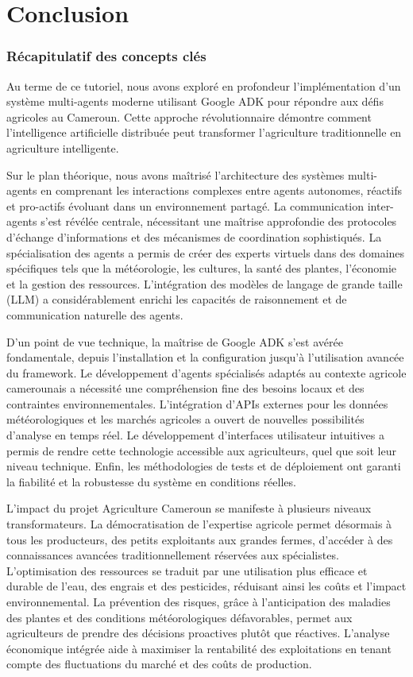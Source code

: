 \chapter*{Conclusion}

\subsection{Récapitulatif des concepts clés}

Au terme de ce tutoriel, nous avons exploré en profondeur l'implémentation d'un système multi-agents moderne utilisant Google ADK pour répondre aux défis agricoles au Cameroun. Cette approche révolutionnaire démontre comment l'intelligence artificielle distribuée peut transformer l'agriculture traditionnelle en agriculture intelligente.

Sur le plan théorique, nous avons maîtrisé l'architecture des systèmes multi-agents en comprenant les interactions complexes entre agents autonomes, réactifs et pro-actifs évoluant dans un environnement partagé. La communication inter-agents s'est révélée centrale, nécessitant une maîtrise approfondie des protocoles d'échange d'informations et des mécanismes de coordination sophistiqués. La spécialisation des agents a permis de créer des experts virtuels dans des domaines spécifiques tels que la météorologie, les cultures, la santé des plantes, l'économie et la gestion des ressources. L'intégration des modèles de langage de grande taille (LLM) a considérablement enrichi les capacités de raisonnement et de communication naturelle des agents.

D'un point de vue technique, la maîtrise de Google ADK s'est avérée fondamentale, depuis l'installation et la configuration jusqu'à l'utilisation avancée du framework. Le développement d'agents spécialisés adaptés au contexte agricole camerounais a nécessité une compréhension fine des besoins locaux et des contraintes environnementales. L'intégration d'APIs externes pour les données météorologiques et les marchés agricoles a ouvert de nouvelles possibilités d'analyse en temps réel. Le développement d'interfaces utilisateur intuitives a permis de rendre cette technologie accessible aux agriculteurs, quel que soit leur niveau technique. Enfin, les méthodologies de tests et de déploiement ont garanti la fiabilité et la robustesse du système en conditions réelles.

L'impact du projet Agriculture Cameroun se manifeste à plusieurs niveaux transformateurs. La démocratisation de l'expertise agricole permet désormais à tous les producteurs, des petits exploitants aux grandes fermes, d'accéder à des connaissances avancées traditionnellement réservées aux spécialistes. L'optimisation des ressources se traduit par une utilisation plus efficace et durable de l'eau, des engrais et des pesticides, réduisant ainsi les coûts et l'impact environnemental. La prévention des risques, grâce à l'anticipation des maladies des plantes et des conditions météorologiques défavorables, permet aux agriculteurs de prendre des décisions proactives plutôt que réactives. L'analyse économique intégrée aide à maximiser la rentabilité des exploitations en tenant compte des fluctuations du marché et des coûts de production.

